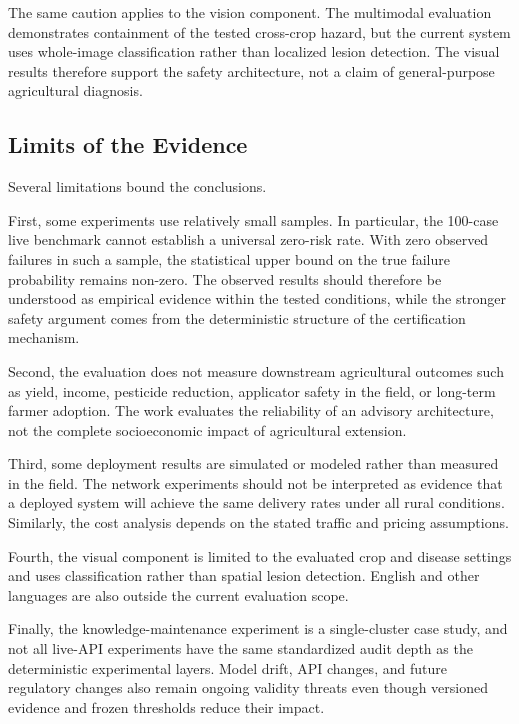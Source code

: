 \documentclass[a4paper,fleqn]{cas-dc}
\begin{document}
The same caution applies to the vision component. The multimodal evaluation demonstrates containment of the tested cross-crop hazard, but the current system uses whole-image classification rather than localized lesion detection. The visual results therefore support the safety architecture, not a claim of general-purpose agricultural diagnosis.

\subsection{Limits of the Evidence}

Several limitations bound the conclusions.

First, some experiments use relatively small samples. In particular, the 100-case live benchmark cannot establish a universal zero-risk rate. With zero observed failures in such a sample, the statistical upper bound on the true failure probability remains non-zero. The observed results should therefore be understood as empirical evidence within the tested conditions, while the stronger safety argument comes from the deterministic structure of the certification mechanism. 

Second, the evaluation does not measure downstream agricultural outcomes such as yield, income, pesticide reduction, applicator safety in the field, or long-term farmer adoption. The work evaluates the reliability of an advisory architecture, not the complete socioeconomic impact of agricultural extension.

Third, some deployment results are simulated or modeled rather than measured in the field. The network experiments should not be interpreted as evidence that a deployed system will achieve the same delivery rates under all rural conditions. Similarly, the cost analysis depends on the stated traffic and pricing assumptions. 

Fourth, the visual component is limited to the evaluated crop and disease settings and uses classification rather than spatial lesion detection. English and other languages are also outside the current evaluation scope. 

Finally, the knowledge-maintenance experiment is a single-cluster case study, and not all live-API experiments have the same standardized audit depth as the deterministic experimental layers. Model drift, API changes, and future regulatory changes also remain ongoing validity threats even though versioned evidence and frozen thresholds reduce their impact. 
\end{document}
